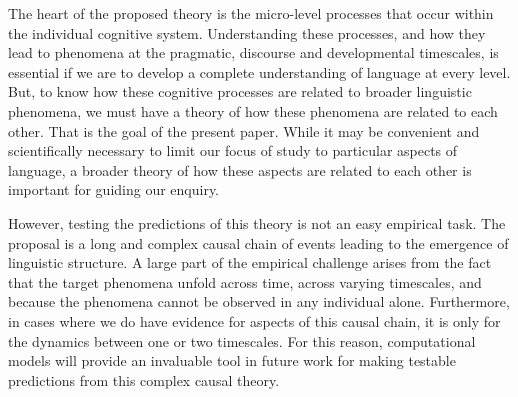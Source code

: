 \documentclass[man, noapacite, 12pt]{apa2}
\begin{document}
The heart of the proposed theory is the micro-level processes that occur within the individual cognitive system. Understanding these processes, and how they lead to phenomena at the pragmatic, discourse and developmental timescales, is essential if we are to develop a complete understanding of language at every level. But, to know how these cognitive processes are related to broader linguistic phenomena, we must have a theory of how these phenomena are related to each other. That is the goal of the present paper. While it may be convenient and scientifically necessary to limit our focus of study to particular aspects of language, a broader theory of how these aspects are related  to each other is important for guiding our  enquiry. 

However, testing the predictions of this theory is not an easy empirical task. The proposal is a long and complex causal chain of events leading to the emergence of linguistic structure. A large part of the empirical challenge arises from the fact that the target phenomena unfold  across time, across varying timescales, and because the phenomena cannot be observed in any individual alone. Furthermore, in cases where we do have evidence for aspects of this causal chain, it is only for the dynamics between one or two timescales. For this reason, computational models will provide an invaluable tool in future work for making testable predictions from this complex causal theory. 



\newpage


\end{document}

